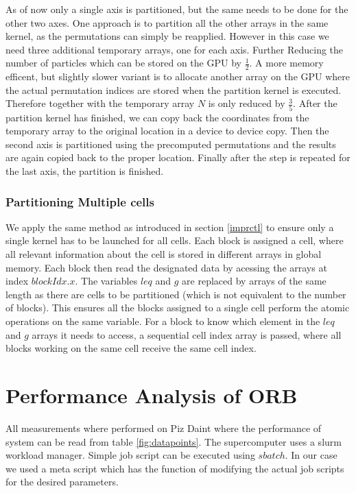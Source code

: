 \documentclass[]{article}
\begin{document}
As of now only a single axis is partitioned, but the same needs to be done for the other two axes. One approach is to partition all the other arrays in the same kernel, as the permutations can simply be reapplied. However in this case we need three additional temporary arrays, one for each axis. Further Reducing the number of particles which can be stored on the GPU by $\frac{1}{2}$. A more memory efficent, but slightly slower variant is to allocate another array on the GPU where the actual permutation indices are stored when the partition kernel is executed. Therefore together with the temporary array $N$ is only reduced by $\frac{3}{5}$. After the partition kernel has finished, we can copy back the coordinates from the temporary array to the original location in a device to device copy. Then the second axis is partitioned using the precomputed permutations and the results are again copied back to the proper location. Finally after the step is repeated for the last axis, the partition is finished.

\subsubsection{Partitioning Multiple cells}

We apply the same method as introduced in section \ref{imprctl} to ensure only a single kernel has to be launched for all cells. 
Each block is assigned a cell, where all relevant information about the cell is stored in different arrays in global memory. Each block then read the designated data by acessing the arrays at index $blockIdx.x$. The variables $leq$ and $g$ are replaced by arrays of the same length as there are cells to be partitioned (which is not equivalent to the number of blocks). This ensures all the blocks assigned to a single cell perform the atomic operations on the same variable. For a block to know which element in the $leq$ and $g$ arrays it needs to access, a sequential cell index array is passed, where all blocks working on the same cell receive the same cell index. 


\newpage
\section{Performance Analysis of ORB}\label{sec:empan}

All measurements where performed on Piz Daint where the performance of system can be read from table \ref{fig:datapoints}. The supercomputer uses a slurm workload manager. \cite{Slurm} Simple job script can be executed using $sbatch$. In our case we used a meta script which has the function of modifying the actual job scripts for the desired parameters. 
\end{document}
